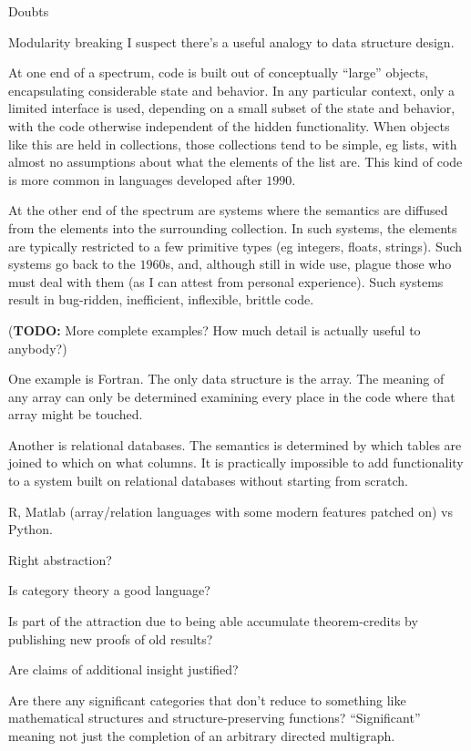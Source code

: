 \begin{plSection}{Doubts}
\begin{plSection}{Modularity breaking}
I suspect there's a useful analogy to data structure design.

At one end of a spectrum, code is built out of conceptually 
``large'' objects, encapsulating considerable state and
behavior. In any particular context, only a limited interface
is used, depending on a small subset of the state and behavior,
with the code otherwise independent of the hidden functionality.
When objects like this are held in collections, those collections
tend to be simple, eg lists, with almost no assumptions
about what the elements of the list are.
This kind of code is more common in languages developed 
after $1990$.

At the other end of the spectrum are systems where the semantics
are diffused from the elements into the surrounding collection.
In such systems, the elements are typically restricted 
to a few primitive types (eg integers, floats, strings).
Such systems go back to the $1960$s, 
and, although still in wide use,
plague those who must deal with them (as I can attest from personal
experience).
Such systems result in bug-ridden, inefficient, 
inflexible, brittle code.

(\textbf{TODO:} More complete examples? 
How much detail is actually useful to anybody?)

One example is Fortran. The only data structure is the array.
The meaning of any array can only be determined examining every
place in the code where that array might be touched.

Another is relational databases. The semantics is determined
by which tables are joined to which on what columns.
It is practically impossible to add functionality to a system
built on relational databases without starting from scratch.

R, Matlab (array/relation languages with some modern features
patched on) vs Python.

\end{plSection}%
\begin{plSection}{Right abstraction?}
\label{sec:Right-abstraction}

Is category theory a good language?~\cite{wiki:AbstractNonsense}

Is part of the attraction due to being able accumulate
theorem-credits by publishing
new proofs of old results?

Are claims of additional insight justified?

Are there any significant categories 
that don't reduce to something like mathematical structures
and structure-preserving functions?
``Significant'' meaning not just the completion of an arbitrary
directed multigraph.



\end{plSection}
\end{plSection}
